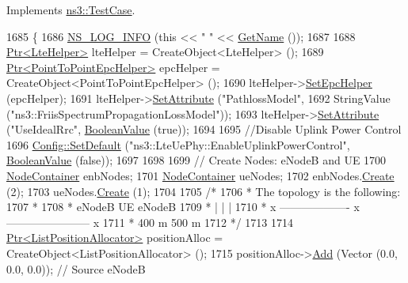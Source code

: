 Implements \hyperlink{classns3_1_1TestCase_a8ff74680cf017ed42011e4be51917a24}{ns3\+::\+Test\+Case}.


\begin{DoxyCode}
1685 \{
1686   \hyperlink{group__logging_gafbd73ee2cf9f26b319f49086d8e860fb}{NS\_LOG\_INFO} (\textcolor{keyword}{this} << \textcolor{stringliteral}{" "} << \hyperlink{classns3_1_1TestCase_a28f7bb59669c24dae1c290fc17fc9b62}{GetName} ());
1687 
1688   \hyperlink{classns3_1_1Ptr}{Ptr<LteHelper>} lteHelper = CreateObject<LteHelper> ();
1689   \hyperlink{classns3_1_1Ptr}{Ptr<PointToPointEpcHelper>} epcHelper = CreateObject<PointToPointEpcHelper> ();
1690   lteHelper->\hyperlink{classns3_1_1LteHelper_a324079a1ccd54ce949786b83d6b95915}{SetEpcHelper} (epcHelper);
1691   lteHelper->\hyperlink{classns3_1_1ObjectBase_ac60245d3ea4123bbc9b1d391f1f6592f}{SetAttribute} (\textcolor{stringliteral}{"PathlossModel"},
1692                            StringValue (\textcolor{stringliteral}{"ns3::FriisSpectrumPropagationLossModel"}));
1693   lteHelper->\hyperlink{classns3_1_1ObjectBase_ac60245d3ea4123bbc9b1d391f1f6592f}{SetAttribute} (\textcolor{stringliteral}{"UseIdealRrc"}, \hyperlink{classns3_1_1BooleanValue}{BooleanValue} (\textcolor{keyword}{true}));
1694 
1695   \textcolor{comment}{//Disable Uplink Power Control}
1696   \hyperlink{group__config_ga2e7882df849d8ba4aaad31c934c40c06}{Config::SetDefault} (\textcolor{stringliteral}{"ns3::LteUePhy::EnableUplinkPowerControl"}, 
      \hyperlink{classns3_1_1BooleanValue}{BooleanValue} (\textcolor{keyword}{false}));
1697 
1698 
1699   \textcolor{comment}{// Create Nodes: eNodeB and UE}
1700   \hyperlink{classns3_1_1NodeContainer}{NodeContainer} enbNodes;
1701   \hyperlink{classns3_1_1NodeContainer}{NodeContainer} ueNodes;
1702   enbNodes.\hyperlink{classns3_1_1NodeContainer_a787f059e2813e8b951cc6914d11dfe69}{Create} (2);
1703   ueNodes.\hyperlink{classns3_1_1NodeContainer_a787f059e2813e8b951cc6914d11dfe69}{Create} (1);
1704 
1705   \textcolor{comment}{/*}
1706 \textcolor{comment}{   * The topology is the following:}
1707 \textcolor{comment}{   *}
1708 \textcolor{comment}{   * eNodeB                   UE                     eNodeB}
1709 \textcolor{comment}{   *    |                     |                         |}
1710 \textcolor{comment}{   *    x ------------------- x ----------------------- x}
1711 \textcolor{comment}{   *             400 m                   500 m}
1712 \textcolor{comment}{   */}
1713 
1714   \hyperlink{classns3_1_1Ptr}{Ptr<ListPositionAllocator>} positionAlloc = CreateObject<ListPositionAllocator> 
      ();
1715   positionAlloc->\hyperlink{classns3_1_1ListPositionAllocator_a460e82f015ac012a73ba0ea0cccb3486}{Add} (Vector (0.0, 0.0, 0.0)); \textcolor{comment}{// Source eNodeB}

\end{DoxyCode}
